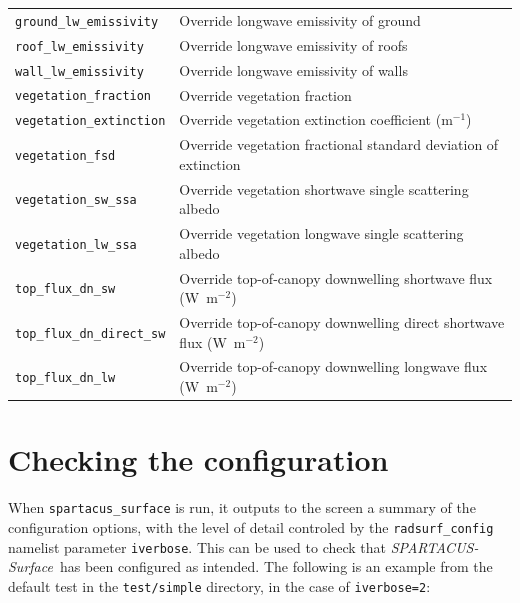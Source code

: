 \documentclass[a4,oneside]{article}
\def\codesize{\small}
\def\codetabsize{\footnotesize}
\def\spsurf{\emph{SPARTACUS-Surface}}
\def\code#1{{\codesize\texttt{#1}}}
\def\codetab#1{{\codetabsize\texttt{#1}}}
\begin{document}
\begin{center}
\begin{longtable}{ll}
\codetab{ground\_lw\_emissivity} & Override longwave emissivity of ground\\
\codetab{roof\_lw\_emissivity} & Override longwave emissivity of roofs\\
\codetab{wall\_lw\_emissivity} & Override longwave emissivity of walls\\
\codetab{vegetation\_fraction} & Override vegetation fraction \\
\codetab{vegetation\_extinction} & Override vegetation extinction coefficient (m$^{-1}$)\\
\codetab{vegetation\_fsd} & Override vegetation fractional standard deviation of extinction\\
\codetab{vegetation\_sw\_ssa} & Override vegetation shortwave single scattering albedo \\
\codetab{vegetation\_lw\_ssa} & Override vegetation longwave single scattering albedo \\
\codetab{top\_flux\_dn\_sw} & Override top-of-canopy downwelling shortwave flux (W~m$^{-2}$)\\
\codetab{top\_flux\_dn\_direct\_sw} & Override top-of-canopy downwelling direct shortwave flux (W~m$^{-2}$)\\
\codetab{top\_flux\_dn\_lw} & Override top-of-canopy downwelling longwave flux (W~m$^{-2}$)\\
\hline
\end{longtable}
\end{center}

\section{Checking the configuration}
\label{sec:checking}
When \code{spartacus\_surface} is run, it outputs to the screen a
summary of the configuration options, with the level of detail
controled by the \code{radsurf\_config} namelist parameter
\code{iverbose}. This can be used to check that \spsurf\ has been
configured as intended.  The following is an example from the default
test in the \code{test/simple} directory, in the case of
\code{iverbose=2}:
\end{document}

